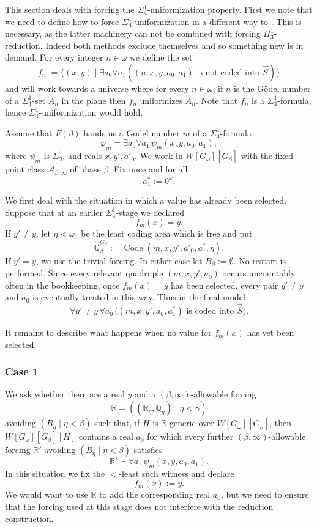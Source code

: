 \documentclass[a4paper,11pt]{article}
\newcommand{\forceQ}{\mathbb{Q}}
\newcommand{\forceR}{\mathbb{R}}
\begin{document}
This section deals with forcing the $\Sigma^1_4$-uniformization property. First we note that we need to define how to force $\Sigma^1_4$-uniformization in a different way to \cite{BPFA and uniformization}. This is necessary, as the latter machinery can not be combined with forcing $\Pi^1_3$-reduction. Indeed both methods exclude themselves and so something new is in demand.
For every integer $n\in\omega$ we define the set
\[
f_n:=\{(x,y)\mid\exists a_0\forall a_1((n,x,y,a_0,a_1)\text{ is not coded into $\vec S$})\}
\]
and will work towards a universe where for every $n\in\omega$, if $n$ is the G\"odel number of a $\Sigma^1_4$-set $A_n$ in the plane then $f_n$ uniformizes $A_n$. Note that $f_n$ is a $\Sigma^1_4$-formula, hence $\Sigma^1_4$-uniformization would hold.

Assume that $F(\beta)$ hands us a G\"odel number $m$ of a $\Sigma^1_4$-formula
\[
\varphi_m=\exists a_0\forall a_1\,\psi_m(x,y,a_0,a_1),
\]
where $\psi_m$ is $\Sigma^1_2$, and reals $x,y',a'_0$. We work in $W[G_\omega][G_\beta]$ with the fixed-point class $\mathcal A_{\beta,\infty}$ of phase $\beta$. Fix once and for all
\[
a_1^*:=0^\omega.
\]

We first deal with the situation in which a value has already been selected. Suppose that at an earlier $\Sigma^1_4$-stage we declared
\[
f_m(x)=y.
\]
If $y'\neq y$, let $\eta<\omega_1$ be the least coding area which is free and put
\[
\dot{\forceQ}_\beta^{G_\beta}
:=\operatorname{Code}(m,x,y',a'_0,a_1^*,\eta).
\]
If $y'=y$, we use the trivial forcing. In either case let $B_\beta:=\emptyset$. No restart is performed. Since every relevant quadruple $(m,x,y',a_0)$ occurs uncountably often in the bookkeeping, once $f_m(x)=y$ has been selected, every pair $y'\neq y$ and $a_0$ is eventually treated in this way. Thus in the final model
\[
\forall y'\neq y\,\forall a_0\,
\bigl((m,x,y',a_0,a_1^*)\text{ is coded into }\vec S\bigr).
\]

It remains to describe what happens when no value for $f_m(x)$ has yet been selected.

\subsubsection{Case 1}

We ask whether there are a real $y$ and a $(\beta,\infty)$-allowable forcing
\[
\forceR=((\forceR_\eta,\dot{\forceQ}_\eta)\mid\eta<\gamma)
\]
avoiding $(B_\eta\mid\eta<\beta)$ such that, if $H$ is $\forceR$-generic over $W[G_\omega][G_\beta]$, then $W[G_\omega][G_\beta][H]$ contains a real $a_0$ for which every further $(\beta,\infty)$-allowable forcing $\forceR'$ avoiding $(B_\eta\mid\eta<\beta)$ satisfies
\[
\forceR'\Vdash\forall a_1\,\psi_m(x,y,a_0,a_1).
\]
In this situation we fix the $<$-least such witness and declare
\[
f_m(x):=y.
\]
We would want to use $\forceR$ to add the corresponding real $a_0$, but we need to ensure that the forcing used at this stage does not interfere with the reduction construction.
\end{document}
